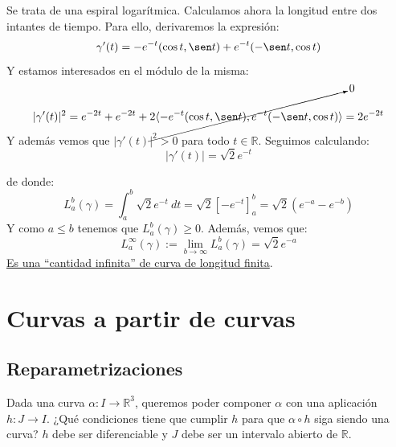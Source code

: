 \begin{ejemplo}
\begin{enumerate}
            Se trata de una espiral logarítmica. Calculamos ahora la longitud entre dos intantes de tiempo. Para ello, derivaremos la expresión:
            \begin{equation*}
                \gamma'(t) = -e^{-t}(\cos t, \sen t) + e^{-t}(-\sen t, \cos t) 
            \end{equation*}
            Y estamos interesados en el módulo de la misma:
            \begin{equation*}
                |\gamma'(t)|^2 = e^{-2t} + e^{-2t} + \cancelto{0}{2\langle -e^{-t}(\cos t,\sen t),e^{-t}(-\sen t,\cos t) \rangle}  = 2e^{-2t}
            \end{equation*}
            Y además vemos que $|\gamma'(t)|^2>0$ para todo $t\in \mathbb{R}$. Seguimos calculando:
            \begin{equation*}
                |\gamma'(t)| = \sqrt{2}e^{-t}
            \end{equation*}

            de donde:
            \begin{equation*}
                L_a^b(\gamma) = \int_{a}^{b} \sqrt{2}e^{-t}~dt  = \sqrt{2}\left[-e^{-t}\right]_a^b = \sqrt{2}\left(e^{-a}-e^{-b}\right)
            \end{equation*}
            Y como $a\leq b$ tenemos que $L_a^b(\gamma)\geq 0$. Además, vemos que:
            \begin{equation*}
                L_a^\infty(\gamma) := \lim_{b\to\infty}L_a^b(\gamma) = \sqrt{2}e^{-a}
            \end{equation*}
            \underline{Es una ``cantidad infinita'' de curva de longitud finita}.
    \end{enumerate}
\end{ejemplo}

\section{Curvas a partir de curvas}
\subsection{Reparametrizaciones}
\noindent
Dada una curva $\alpha:I\to \mathbb{R}^3$, queremos poder componer $\alpha$ con una aplicación $h:J\to I$. ¿Qué condiciones tiene que cumplir $h$ para que $\alpha\circ h$ siga siendo una curva? $h$ debe ser diferenciable y $J$ debe ser un intervalo abierto de $\mathbb{R}$.\\

